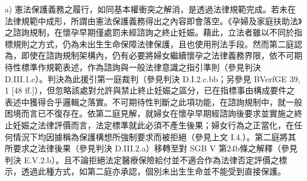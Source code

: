 \documentclass[12pt]{article}
\begin{document}
\begin{transpara}
a) 憲法保護義務之履行，如同基本權衝突之解消，是透過法律規範完成。若未在法律規範中成形，所謂由憲法保護義務得出之內容即會落空。《孕婦及家庭扶助法》之諮詢規制，在懷孕早期僅處罰未經諮詢之終止妊娠。藉此，立法者雖以不同於指標規則之方式，仍為未出生生命保障法律保護，且也使用刑法手段。然而第二庭認為，即使在諮詢規制架構內，仍有必要將婦女繼續懷孕之法律義務界限，依不可期待性標準作規範表述，作為諮詢與一般法律意識之指引準則（參見判決 D.III.1.c）。判決為此援引第一庭裁判（參見判決 D.I.2.c.bb；另參見 BVerfGE 39, 1 [48 ff.]），但忽略該處對允許與禁止終止妊娠之區分，已在指標事由構成要件之表述中獲得合乎邏輯之落實。不可期待性判斷之此項功能，在諮詢規制中，就一般困境而言已不復存在。依第二庭見解，就婦女在懷孕早期經諮詢後要求並實施之終止妊娠之法律評價而言，法定標準就此必須不產生後果；婦女行為之正當化，在任何情況下均因據稱為保護構想所強制要求而被拒絕（參見上文 I.4.）。第二庭將其所要求之法律後果（參見判決 D.III.2.a）移轉至對 SGB V 第24b條之解釋（參見判決 E.V.2.b）。且不論拒絕法定醫療保險給付並不適合作為法律否定評價之標示，透過此種方式，如第二庭亦承認，個別未出生生命並不能受到直接保護。
\end{transpara}
\end{document}
